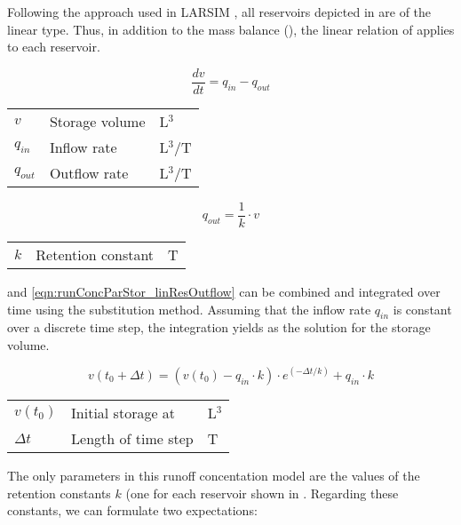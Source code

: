 Following the approach used in LARSIM \citep{Ludwig2006}, all reservoirs depicted in  are of the linear type. Thus, in addition to the mass balance (), the linear relation of  applies to each reservoir.

\begin{equation} \label{eqn:runConcParStor_linResBalance}
  \frac{dv}{dt} = q_{in} - q_{out}
\end{equation}
\medskip
\begin{tabular}{lll}
  $v$ & Storage volume & L$^3$ \\
  $q_{in}$ & Inflow rate & L$^3$/T\\
  $q_{out}$ & Outflow rate & L$^3$/T\\
\end{tabular}

\begin{equation} \label{eqn:runConcParStor_linResOutflow}
  q_{out}= \frac{1}{k} \cdot v
\end{equation}
\medskip
\begin{tabular}{lll}
  $k$ & Retention constant & T \\
\end{tabular}

 and \ref{eqn:runConcParStor_linResOutflow} can be combined and integrated over time using the substitution method. Assuming that the inflow rate $q_{in}$ is constant over a discrete time step, the integration yields  as the solution for the storage volume.

\begin{equation} \label{eqn:runConcParStor_linResSolution}
  v(t_0 + \Delta t) =  (v(t_0) - q_{in} \cdot k) \cdot e^{(-\Delta t / k)} + q_{in} \cdot k
\end{equation}
\medskip
\begin{tabular}{lll}
  $v(t_0)$ & Initial storage at & L$^3$ \\
  $\Delta t$ & Length of time step & T \\
\end{tabular}

The only parameters in this runoff concentation model are the values of the retention constants $k$ (one for each reservoir shown in . Regarding these constants, we can formulate two expectations:

